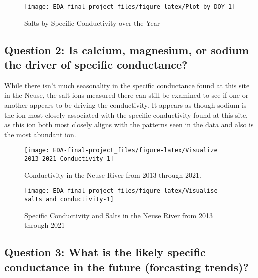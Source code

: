 \documentclass[
  12pt,
]{article}
\begin{document}
\begin{figure}

\texttt{[image: EDA-final-project\_files/figure-latex/Plot by DOY-1]} \hfill{}

\caption{Salts by Specific Conductivity over the Year}\label{fig:Plot by DOY}
\end{figure}

\newpage

\hypertarget{question-2-is-calcium-magnesium-or-sodium-the-driver-of-specific-conductance}{%
\subsection{Question 2: Is calcium, magnesium, or sodium the driver of
specific
conductance?}\label{question-2-is-calcium-magnesium-or-sodium-the-driver-of-specific-conductance}}

While there isn't much seasonality in the specific conductance found at
this site in the Neuse, the salt ions measured there can still be
examined to see if one or another appears to be driving the
conductivity. It appears as though sodium is the ion most closely
associated with the specific conductivity found at this site, as this
ion both most closely aligns with the patterns seen in the data and also
is the most abundant ion.

\begin{figure}

\texttt{[image: EDA-final-project\_files/figure-latex/Visualize 2013-2021 Conductivity-1]} \hfill{}

\caption{Conductivity in the Neuse River from 2013 through 2021.}\label{fig:Visualize 2013-2021 Conductivity}
\end{figure}

\begin{figure}

\texttt{[image: EDA-final-project\_files/figure-latex/Visualise salts and conductivity-1]} \hfill{}

\caption{Specific Conductivity and Salts in the Neuse River from 2013 through 2021}\label{fig:Visualise salts and conductivity}
\end{figure}

\hypertarget{question-3-what-is-the-likely-specific-conductance-in-the-future-forcasting-trends}{%
\subsection{Question 3: What is the likely specific conductance in the
future (forcasting
trends)?}\label{question-3-what-is-the-likely-specific-conductance-in-the-future-forcasting-trends}}
\end{document}
